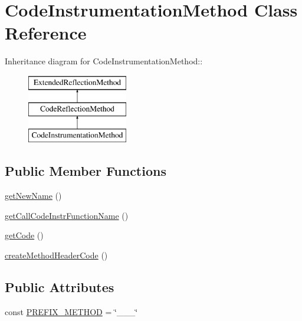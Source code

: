 \hypertarget{class_code_instrumentation_method}{
\section{CodeInstrumentationMethod Class Reference}
\label{class_code_instrumentation_method}
}
Inheritance diagram for CodeInstrumentationMethod::\begin{figure}[H]
\begin{center}
\leavevmode
\includegraphics[height=3cm]{class_code_instrumentation_method}
\end{center}
\end{figure}
\subsection*{Public Member Functions}
\begin{CompactItemize}
\item 
\hyperlink{class_code_instrumentation_method_4158b6c8a6183afecc0a9847ad3aeb53}{getNewName} ()
\item 
\hyperlink{class_code_instrumentation_method_c07a68881c058097ce6914ce9dc96e4e}{getCallCodeInstrFunctionName} ()
\item 
\hyperlink{class_code_instrumentation_method_b79054196e5abf3e3464ad0551a9af71}{getCode} ()
\item 
\hyperlink{class_code_instrumentation_method_0eab7bf9706fa3867605f3db1822c333}{createMethodHeaderCode} ()
\end{CompactItemize}
\subsection*{Public Attributes}
\begin{CompactItemize}
\item 
const \hyperlink{class_code_instrumentation_method_fb4c19a6fcdb8dbcaff2d8e5c4dbe9fe}{PREFIX\_\-METHOD} = \char`\"{}\_\-\_\-\_\-\char`\"{}
\end{CompactItemize}
